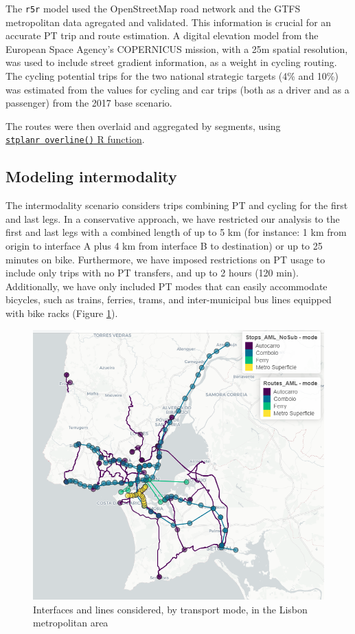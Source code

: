 \documentclass[runningheads]{llncs}
\begin{document}
The \texttt{r5r} model used the OpenStreetMap road network and the GTFS
metropolitan data agregated and validated. This information is crucial
for an accurate PT trip and route estimation. A digital elevation model
from the European Space Agency's COPERNICUS mission, with a 25m spatial
resolution, was used to include street gradient information, as a weight
in cycling routing. The cycling potential trips for the two national
strategic targets (4\% and 10\%) was estimated from the values for
cycling and car trips (both as a driver and as a passenger) from the
2017 base scenario.

The routes were then overlaid and aggregated by segments, using
\href{https://docs.ropensci.org/stplanr/reference/overline.html}{\texttt{stplanr\ overline()}
R function}.

\hypertarget{modeling-intermodality}{%
\subsection{Modeling intermodality}\label{modeling-intermodality}}

The intermodality scenario considers trips combining PT and cycling for
the first and last legs. In a conservative approach, we have restricted
our analysis to the first and last legs with a combined length of up to
5 km (for instance: 1 km from origin to interface A plus 4 km from
interface B to destination) or up to 25 minutes on bike. Furthermore, we
have imposed restrictions on PT usage to include only trips with no PT
transfers, and up to 2 hours (120 min). Additionally, we have only
included PT modes that can easily accommodate bicycles, such as trains,
ferries, trams, and inter-municipal bus lines equipped with bike racks
(Figure \ref{fig:map1}).

\begin{figure}

{\centering \includegraphics[width=0.6\linewidth,]{img/map1} 

}

\caption{Interfaces and lines considered, by transport mode, in the Lisbon metropolitan area}\label{fig:map1}
\end{figure}
\end{document}
